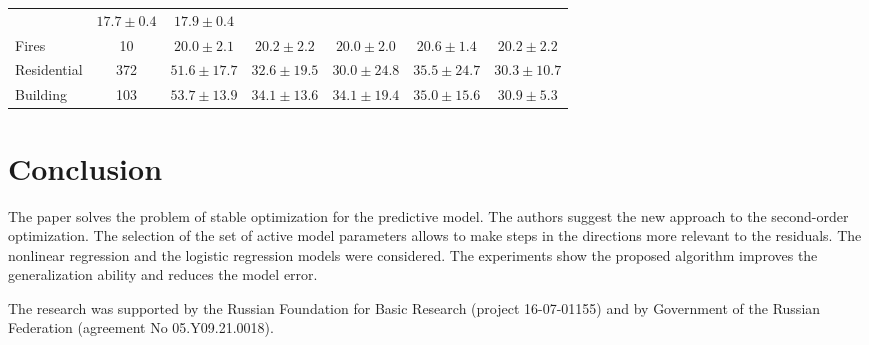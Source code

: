 \documentclass[
11pt,%
tightenlines,%
twoside,%
onecolumn,%
nofloats,%
nobibnotes,%
nofootinbib,%
superscriptaddress,%
noshowpacs,%
centertags]%
{revtex4}
\begin{document}
\begin{table}[!h]
\begin{tabular}{|l|c|c|c|c|c|c|}
			& $17.7\pm0.4$             
			& $17.9\pm0.4$   \\ 
			Fires
			&\multicolumn{1}{c|}{10}
			& \multicolumn{1}{c|}{$\mathbf{20.0\pm2.1}$}
			& \multicolumn{1}{c|}{ $20.2\pm2.2$}
			& \multicolumn{1}{c|}{ $\mathbf{20.0\pm2.0}$}
			& \multicolumn{1}{c|}{ $20.6\pm1.4$}
			& \multicolumn{1}{c|}{ $20.2\pm2.2$} \\ 
			\hline
			Residential
			& 372
			&  $51.6\pm17.7$
			&  $32.6\pm19.5$
			&  $30.0\pm24.8$            
			&  $35.5\pm24.7$            
			&   $30.3\pm10.7$ \\ 
			Building
			&\multicolumn{1}{c|}{103}
			& \multicolumn{1}{c|}{ $53.7\pm13.9$}
			& \multicolumn{1}{c|}{ $34.1\pm13.6$}
			& \multicolumn{1}{c|}{ $34.1\pm19.4$}
			& \multicolumn{1}{c|}{ $35.0\pm15.6$}
			& \multicolumn{1}{c|}{ $\mathbf{30.9\pm5.3}$} \\ 
			\hline
		\end{tabular}
\end{table}
\section{Conclusion}
The paper solves the problem of stable optimization for the predictive model.
The authors suggest the new approach to the second-order optimization. 
The selection of the set of active model parameters allows to make steps in the directions more relevant to the residuals.
The nonlinear regression and the logistic regression models were considered.
The experiments show the proposed algorithm improves the generalization ability and reduces the model error.

\begin{acknowledgments}

The research was supported by the Russian Foundation for Basic Research (project 16-07-01155) and by Government of the Russian Federation (agreement No 05.Y09.21.0018).

\end{acknowledgments}
\end{document}
